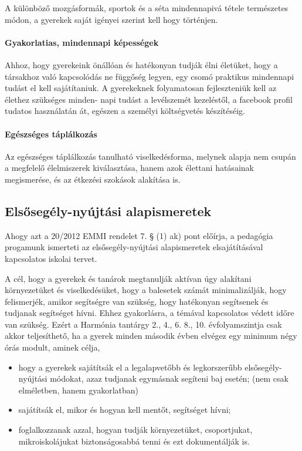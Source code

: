 A különböző mozgásformák, sportok és a séta mindennapivá tétele
természetes módon, a gyerekek saját igényei szerint kell hogy történjen.

\paragraph{Gyakorlatias, mindennapi
      képességek}\label{gyakorlatias-mindennapi-kuxe9pessuxe9gek}

Ahhoz, hogy gyerekeink önállóan és hatékonyan tudják élni életüket, hogy
a társakhoz való kapcsolódás ne függőség legyen, egy csomó praktikus
mindennapi tudást el kell sajátítaniuk. A gyerekeknek folyamatosan
fejleszteniük kell az élethez szükséges minden- napi tudást a
levélszemét kezeléstől, a facebook profil tudatos használatán át,
egészen a személyi költségvetés készítéséig.

\paragraph{Egészséges
      táplálkozás}

Az egészséges táplálkozás tanulható viselkedésforma, melynek alapja nem
csupán a megfelelő élelmiszerek kiválasztása, hanem azok élettani
hatásainak megismerése, és az étkezési szokások alakítása is.

\subsection{Elsősegély-nyújtási alapismeretek}
Ahogy azt a 20/2012 EMMI rendelet 7. § (1) ak) pont előírja, a pedagógia
progamunk ismerteti az elsősegély-nyújtási alapismeretek elsajátításával
kapcsolatos iskolai tervet.

A cél, hogy a gyerekek és tanárok megtanulják aktívan úgy alakítani
környezetüket és viselkedésüket, hogy a balesetek számát minimalizálják, hogy
felismerjék, amikor segítségre van szükség, hogy hatékonyan segítsenek és
tudjanak segítséget hívni. Ehhez gyakorlásra, a témával kapcsolatos
védett időre van szükség. Ezért a Harmónia tantárgy 2., 4., 6. 8., 10.
évfolyamszintja csak akkor teljesíthető,
ha a gyerek minden második évben elvégez egy minimum négy órás modult, aminek
célja,
\begin{itemize}
      \item hogy a gyerekek sajátítsák el a legalapvetőbb és legkorszerűbb
            elsősegély-nyújtási
            módokat, azaz tudjanak egymásnak segíteni baj esetén; (nem csak
            elméletben,
            hanem gyakorlatban)
      \item sajátítsák el, mikor és hogyan kell mentőt, segítséget hívni;
      \item foglalkozzanak azzal, hogyan tudják környezetüket, csoportjukat,
            mikroiskolájukat
            biztonságosabbá tenni és ezt dokumentálják is.
\end{itemize}

